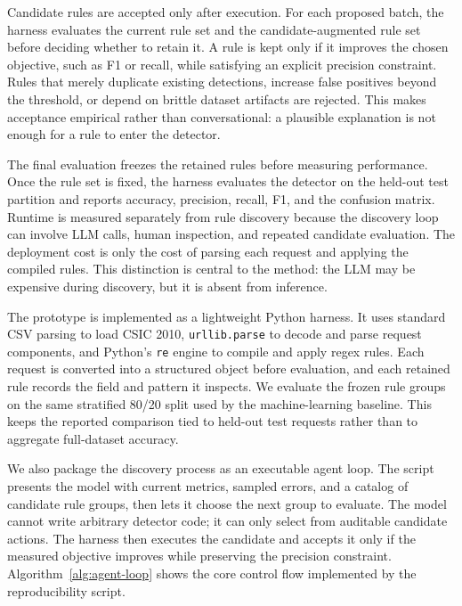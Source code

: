 \documentclass[letterpaper,twocolumn,10pt]{article}
\begin{document}
Candidate rules are accepted only after execution. For each proposed batch, the harness evaluates the current rule set and the candidate-augmented rule set before deciding whether to retain it. A rule is kept only if it improves the chosen objective, such as F1 or recall, while satisfying an explicit precision constraint. Rules that merely duplicate existing detections, increase false positives beyond the threshold, or depend on brittle dataset artifacts are rejected. This makes acceptance empirical rather than conversational: a plausible explanation is not enough for a rule to enter the detector.

The final evaluation freezes the retained rules before measuring performance. Once the rule set is fixed, the harness evaluates the detector on the held-out test partition and reports accuracy, precision, recall, F1, and the confusion matrix. Runtime is measured separately from rule discovery because the discovery loop can involve LLM calls, human inspection, and repeated candidate evaluation. The deployment cost is only the cost of parsing each request and applying the compiled rules. This distinction is central to the method: the LLM may be expensive during discovery, but it is absent from inference.

The prototype is implemented as a lightweight Python harness. It uses standard CSV parsing to load CSIC 2010, \texttt{urllib.parse} to decode and parse request components, and Python's \texttt{re} engine to compile and apply regex rules. Each request is converted into a structured object before evaluation, and each retained rule records the field and pattern it inspects. We evaluate the frozen rule groups on the same stratified 80/20 split used by the machine-learning baseline. This keeps the reported comparison tied to held-out test requests rather than to aggregate full-dataset accuracy.

We also package the discovery process as an executable agent loop. The script presents the model with current metrics, sampled errors, and a catalog of candidate rule groups, then lets it choose the next group to evaluate. The model cannot write arbitrary detector code; it can only select from auditable candidate actions. The harness then executes the candidate and accepts it only if the measured objective improves while preserving the precision constraint. Algorithm~\ref{alg:agent-loop} shows the core control flow implemented by the reproducibility script.
\end{document}
